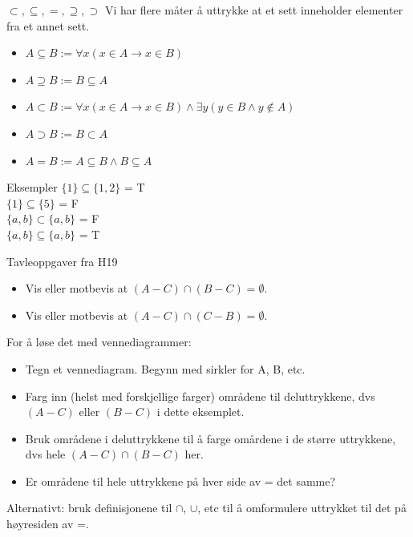 \begin{frame}{$\subset, \subseteq, =, \supseteq, \supset$}
    Vi har flere måter å uttrykke at et sett inneholder elementer fra et annet sett.
    \begin{itemize}
        \item $A \subseteq B := \forall x (x \in A \rightarrow x \in B)$
        \item $A \supseteq B := B \subseteq A$
        \item $A \subset B := \forall x (x \in A \rightarrow x \in B) \land \exists y (y \in B \land y \notin A)$
        \item $A \supset B := B \subset A$
        \item $A = B := A \subseteq B \land B \subseteq A$
    \end{itemize}
    
    \begin{block}{Eksempler}
        $\{1\} \subseteq \{1, 2\}$ = T\\
        $\{1\} \subseteq \{5\}$ = F\\
        $\{a, b\} \subset \{a, b\}$ = F\\
        $\{a, b\} \subseteq \{a, b\}$ = T
    \end{block}
    
\end{frame}

\begin{frame}{Tavleoppgaver fra H19}
    \begin{itemize}
        \item Vis eller motbevis at $(A - C) \cap (B - C) = \emptyset.$
        \item Vis eller motbevis at $(A - C) \cap (C - B) = \emptyset.$
    \end{itemize}
    
    For å løse det med vennediagrammer:
    \begin{itemize}
        \item Tegn et vennediagram. Begynn med sirkler for A, B, etc.
        \item Farg inn (helst med forskjellige farger) områdene til deluttrykkene, dvs $(A - C)$ eller $(B - C)$ i dette eksemplet.
        \item Bruk områdene i deluttrykkene til å farge omårdene i de større uttrykkene, dvs hele $(A - C) \cap (B - C)$ her.
        \item Er områdene til hele uttrykkene på hver side av = det samme?
    \end{itemize}
    Alternativt: bruk definisjonene til $\cap$, $\cup$, etc til å omformulere uttrykket til det på høyresiden av =.
\end{frame}

